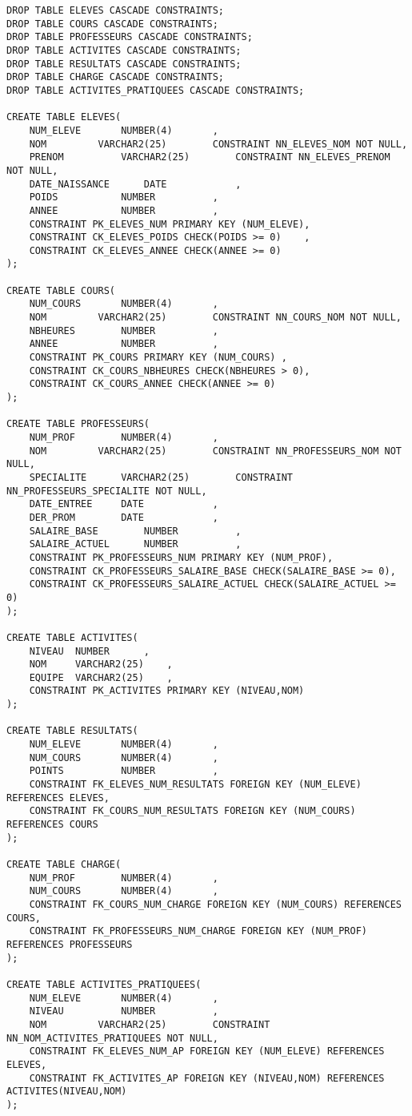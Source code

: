 \documentclass{report}
\begin{document}
\begin{lstlisting}
DROP TABLE ELEVES CASCADE CONSTRAINTS;
DROP TABLE COURS CASCADE CONSTRAINTS;
DROP TABLE PROFESSEURS CASCADE CONSTRAINTS;
DROP TABLE ACTIVITES CASCADE CONSTRAINTS;
DROP TABLE RESULTATS CASCADE CONSTRAINTS;
DROP TABLE CHARGE CASCADE CONSTRAINTS;
DROP TABLE ACTIVITES_PRATIQUEES CASCADE CONSTRAINTS;

CREATE TABLE ELEVES(
	NUM_ELEVE		NUMBER(4)		,
	NOM			VARCHAR2(25)		CONSTRAINT NN_ELEVES_NOM NOT NULL,
	PRENOM			VARCHAR2(25)		CONSTRAINT NN_ELEVES_PRENOM NOT NULL,
	DATE_NAISSANCE		DATE			,
	POIDS			NUMBER			,
	ANNEE			NUMBER			,
	CONSTRAINT PK_ELEVES_NUM PRIMARY KEY (NUM_ELEVE),
	CONSTRAINT CK_ELEVES_POIDS CHECK(POIDS >= 0)	,
	CONSTRAINT CK_ELEVES_ANNEE CHECK(ANNEE >= 0)
);

CREATE TABLE COURS(
	NUM_COURS		NUMBER(4)		,
	NOM			VARCHAR2(25)		CONSTRAINT NN_COURS_NOM NOT NULL,
	NBHEURES		NUMBER			,
	ANNEE			NUMBER			,
	CONSTRAINT PK_COURS PRIMARY KEY (NUM_COURS)	,
	CONSTRAINT CK_COURS_NBHEURES CHECK(NBHEURES > 0),
	CONSTRAINT CK_COURS_ANNEE CHECK(ANNEE >= 0)
);

CREATE TABLE PROFESSEURS(
	NUM_PROF		NUMBER(4)		,
	NOM			VARCHAR2(25)		CONSTRAINT NN_PROFESSEURS_NOM NOT NULL,
	SPECIALITE		VARCHAR2(25)		CONSTRAINT NN_PROFESSEURS_SPECIALITE NOT NULL,
	DATE_ENTREE		DATE			,
	DER_PROM		DATE			,
	SALAIRE_BASE		NUMBER			,
	SALAIRE_ACTUEL		NUMBER			,
	CONSTRAINT PK_PROFESSEURS_NUM PRIMARY KEY (NUM_PROF),
	CONSTRAINT CK_PROFESSEURS_SALAIRE_BASE CHECK(SALAIRE_BASE >= 0),
	CONSTRAINT CK_PROFESSEURS_SALAIRE_ACTUEL CHECK(SALAIRE_ACTUEL >= 0)
);

CREATE TABLE ACTIVITES(
	NIVEAU	NUMBER		,
	NOM		VARCHAR2(25)	,
	EQUIPE	VARCHAR2(25)	,
	CONSTRAINT PK_ACTIVITES PRIMARY KEY (NIVEAU,NOM)
);

CREATE TABLE RESULTATS(
	NUM_ELEVE		NUMBER(4)		,
	NUM_COURS		NUMBER(4)		,
	POINTS 			NUMBER			,
	CONSTRAINT FK_ELEVES_NUM_RESULTATS FOREIGN KEY (NUM_ELEVE) REFERENCES ELEVES,
	CONSTRAINT FK_COURS_NUM_RESULTATS FOREIGN KEY (NUM_COURS) REFERENCES COURS 
);

CREATE TABLE CHARGE(
	NUM_PROF		NUMBER(4)		,
	NUM_COURS		NUMBER(4)		,
	CONSTRAINT FK_COURS_NUM_CHARGE FOREIGN KEY (NUM_COURS) REFERENCES COURS,
	CONSTRAINT FK_PROFESSEURS_NUM_CHARGE FOREIGN KEY (NUM_PROF) REFERENCES PROFESSEURS
);

CREATE TABLE ACTIVITES_PRATIQUEES(
	NUM_ELEVE		NUMBER(4)		,
	NIVEAU			NUMBER			,
	NOM			VARCHAR2(25)		CONSTRAINT NN_NOM_ACTIVITES_PRATIQUEES NOT NULL,
	CONSTRAINT FK_ELEVES_NUM_AP FOREIGN KEY (NUM_ELEVE) REFERENCES ELEVES,
	CONSTRAINT FK_ACTIVITES_AP FOREIGN KEY (NIVEAU,NOM) REFERENCES ACTIVITES(NIVEAU,NOM)
);
\end{lstlisting}
\end{document}
